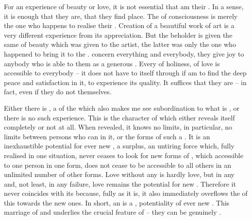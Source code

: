 For an experience of beauty or love, it is not essential that  am their
.  In a sense, it is enough that they are, that they find place.
The  of  consciousness is merely the one who happens
to realise their . Creation of a beautiful work of art is a
very different experience from its appreciation. But the beholder is given the
same  of beauty which was given to the artist, the latter was only the
one who  happened to bring it to the .
 concern everything and everybody, they give joy to anybody
who is able to  them as a generous .   Every
 of holiness, of love is accessible to everybody -- it does
not have to  itself through  if  am to find the deep
peace and satisfaction in it, to experience its quality.  It suffices that they
are -- in fact, even if they do not  themselves.


\pa\label{pa:shareable}
Either there is , a  of the 
which also makes me see  subordination to what is , or there
is no such experience.  This is the character of  which either
reveals itself completely or not at all. When revealed, it knows no limits, in
particular, no limits between persons who can  in it, or the
forms of such a .  It is an inexhaustible potential for ever
new , a surplus, an untiring force which, fully realised in
one situation, never ceases to look for new forms of , which
accessible to one person in one form, does not cease to be accessible to all
others in an unlimited number of other forms.
Love without any  is hardly love, but
in any  and, not least, in any failure, love remains the
potential for new .  Therefore it never coincides with its
 because, fully  as it is, it also immediately overflows
the  of this  towards the new ones.  In short, an
 is a , potentiality of ever new
. This marriage of  and 
underlies the crucial feature of  -- they can be genuinely
. 

